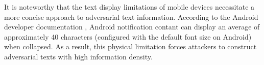 It is noteworthy that the text display limitations of mobile devices necessitate a more concise approach to adversarial text information. According to the Android developer documentation \cite{android2025notifications}, Android notification contant can display an average of approximately 40 characters (configured with the default font size on Android) when collapsed. As a result, this physical limitation forces attackers to construct adversarial texts with high information density.




